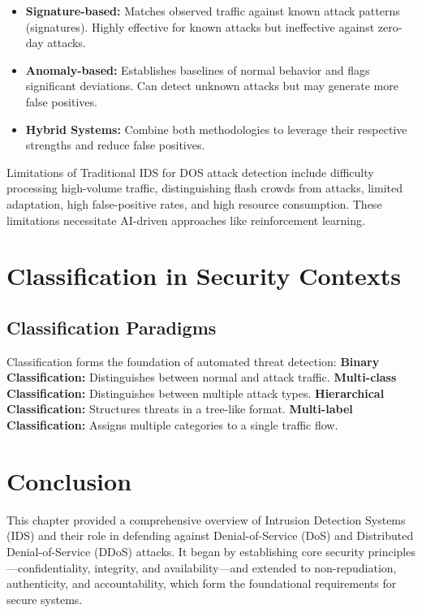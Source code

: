 \documentclass[12pt]{report}
\begin{document}
\begin{itemize}
    \begin{itemize}
        \item \textbf{Signature-based:} Matches observed traffic against known attack patterns (signatures). Highly effective for known attacks but ineffective against zero-day attacks.
        \item \textbf{Anomaly-based:} Establishes baselines of normal behavior and flags significant deviations. Can detect unknown attacks but may generate more false positives.
        \item \textbf{Hybrid Systems:} Combine both methodologies to leverage their respective strengths and reduce false positives.
    \end{itemize}
\end{itemize}

Limitations of Traditional IDS for DOS attack detection include difficulty processing high-volume traffic, distinguishing flash crowds from attacks, limited adaptation, high false-positive rates, and high resource consumption. These limitations necessitate AI-driven approaches like reinforcement learning.

\section{Classification in Security Contexts}
\subsection{Classification Paradigms}
Classification forms the foundation of automated threat detection:
\textbf{Binary Classification:} Distinguishes between normal and attack traffic.
\textbf{Multi-class Classification:} Distinguishes between multiple attack types.
\textbf{Hierarchical Classification:} Structures threats in a tree-like format.
\textbf{Multi-label Classification:} Assigns multiple categories to a single traffic flow.

\section{Conclusion}

This chapter provided a comprehensive overview of Intrusion Detection Systems (IDS) and their role in defending against Denial-of-Service (DoS) and Distributed Denial-of-Service (DDoS) attacks. It began by establishing core security principles—confidentiality, integrity, and availability—and extended to non-repudiation, authenticity, and accountability, which form the foundational requirements for secure systems.
\end{document}
